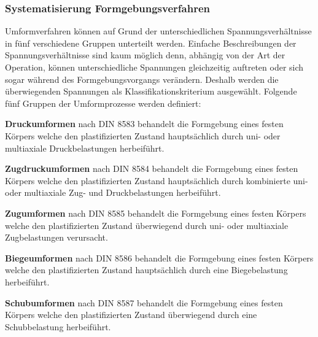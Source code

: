 \documentclass[12pt,a4paper,parskip,twoside,BCOR5mm,headsepline]{scrartcl}
\begin{document}
\begin{description*}
{\subsubsection{Systematisierung Formgebungsverfahren}
Umformverfahren können
auf Grund der unterschiedlichen Spannungsverhältnisse in fünf verschiedene Gruppen unterteilt werden. Einfache Beschreibungen der Spannungsverhältnisse sind kaum möglich denn,  abhängig von der Art der Operation, können  unterschiedliche Spannungen gleichzeitig auftreten oder sich sogar  während des Formgebungsvorgangs verändern. Deshalb werden die überwiegenden Spannungen als Klassifikationskriterium ausgewählt. Folgende fünf Gruppen der Umformprozesse werden definiert:
\begin{enumerate*}
\item \textbf{Druckumformen} nach DIN 8583 behandelt die Formgebung eines festen Körpers  welche den  plastifizierten  Zustand hauptsächlich durch uni- oder multiaxiale Druckbelastungen herbeiführt.
\item \textbf{Zugdruckumformen} nach DIN 8584 behandelt die Formgebung eines festen Körpers  welche den plastifizierten Zustand  hauptsächlich durch kombinierte uni- oder multiaxiale Zug- und Druckbelastungen herbeiführt.
\item \textbf{Zugumformen} nach DIN 8585 behandelt die Formgebung eines festen Körpers welche den plastifizierten Zustand überwiegend durch uni- oder multiaxiale Zugbelastungen verursacht.
\item \textbf{Biegeumformen} nach DIN 8586 behandelt die Formgebung eines festen Körpers welche den plastifizierten Zustand hauptsächlich durch eine Biegebelastung herbeiführt.
\item \textbf{Schubumformen} nach DIN 8587 behandelt die Formgebung eines festen Körpers welche den plastifizierten Zustand überwiegend durch eine Schubbelastung herbeiführt.

\end{enumerate*}

}
\end{description*}
\end{document}
